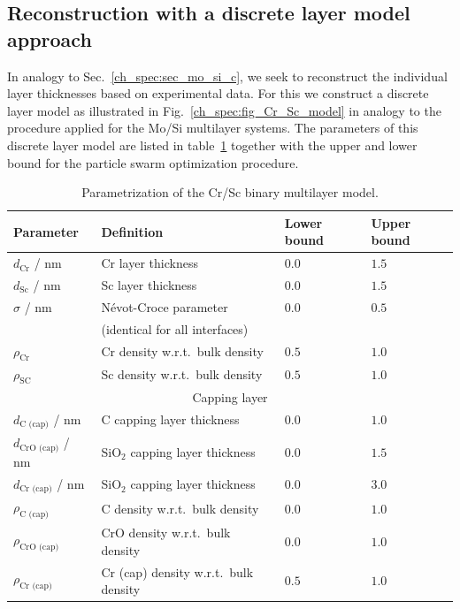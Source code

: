 \subsection{Reconstruction with a discrete layer model approach} \label{ch_spec:sec_CrSc_resconstrution_binary}
In analogy to Sec.~\ref{ch_spec:sec_mo_si_c}, we seek to reconstruct the individual layer thicknesses based on experimental data. For this we construct a discrete layer model as illustrated in Fig.~\ref{ch_spec:fig_Cr_Sc_model} in analogy to the procedure applied for the Mo/Si multilayer systems. The parameters of this discrete layer model are listed in table~\ref{ch_spec:tbl_cr_sc_binary_parameters} together with the upper and lower bound for the particle swarm optimization procedure.
\begin{table}[htbp]
\centering
\caption{Parametrization of the Cr/Sc binary multilayer model.}
\label{ch_spec:tbl_cr_sc_binary_parameters}
\begin{tabular}{@{}llll@{}}
\toprule
Parameter & Definition & Lower bound & Upper bound\\ \midrule
$d_\text{Cr}$ / nm & Cr layer thickness & $0.0$& $1.5$\\ 
$d_\text{Sc}$ / nm & Sc layer thickness& $0.0$& $1.5$\\ 
$\sigma$ / nm & N\'{e}vot-Croce parameter& $0.0$& $0.5$\\ 
&(identical for all interfaces)&&\\
$\rho_\text{Cr}$ &Cr density w.r.t.~bulk density & $0.5$& $1.0$\\ 
$\rho_\text{SC}$ &Sc density w.r.t.~bulk density& $0.5$& $1.0$\\ 
\midrule
\multicolumn{4}{c}{Capping layer}\\
\midrule
$d_\text{C (cap)}$ / nm & C capping layer thickness & $0.0$&$1.0$ \\ 
$d_\text{CrO (cap)}$ / nm & SiO$_2$ capping layer thickness & $0.0$&$1.5$ \\ 
$d_\text{Cr (cap)}$ / nm & SiO$_2$ capping layer thickness & $0.0$&$3.0$ \\ 
$\rho_\text{C (cap)}$ &C density w.r.t.~bulk density& $0.0$& $1.0$\\ 
$\rho_\text{CrO (cap)}$& CrO density w.r.t.~bulk density& $0.0$& $1.0$\\
$\rho_\text{Cr (cap)}$& Cr (cap) density w.r.t.~bulk density & $0.5$& $1.0$  \\
 \bottomrule
\end{tabular}
\end{table}

